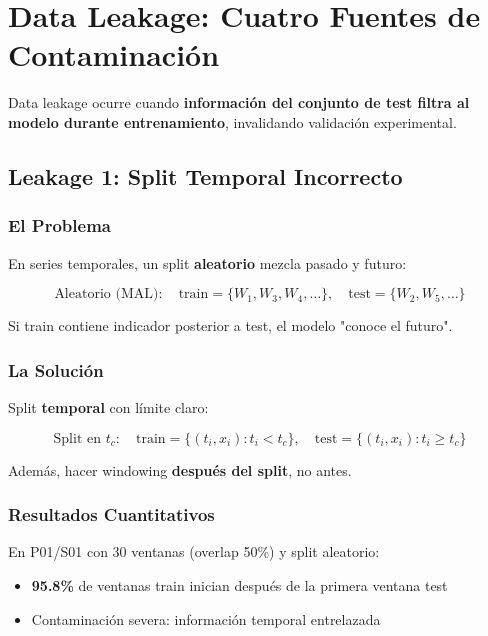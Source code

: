 \documentclass[11pt,twoside,a4paper]{article}
\begin{document}
\newpage
\section{Data Leakage: Cuatro Fuentes de Contaminación}

Data leakage ocurre cuando \textbf{información del conjunto de test filtra al modelo durante entrenamiento}, invalidando validación experimental.

\subsection{Leakage 1: Split Temporal Incorrecto}

\subsubsection{El Problema}

En series temporales, un split \textbf{aleatorio} mezcla pasado y futuro:

\begin{equation}
\text{Aleatorio (MAL)}: \quad \text{train} = \{W_1, W_3, W_4, \ldots\}, \quad \text{test} = \{W_2, W_5, \ldots\}
\end{equation}

Si train contiene indicador posterior a test, el modelo "conoce el futuro".

\subsubsection{La Solución}

Split \textbf{temporal} con límite claro:

\begin{equation}
\text{Split en } t_c: \quad \text{train} = \{(t_i, x_i) : t_i < t_c\}, \quad \text{test} = \{(t_i, x_i) : t_i \geq t_c\}
\end{equation}

Además, hacer windowing \textbf{después del split}, no antes.

\subsubsection{Resultados Cuantitativos}

En P01/S01 con 30 ventanas (overlap 50\%) y split aleatorio:
\begin{itemize}
    \item \textbf{95.8\%} de ventanas train inician después de la primera ventana test
    \item Contaminación severa: información temporal entrelazada
\end{itemize}
\end{document}
